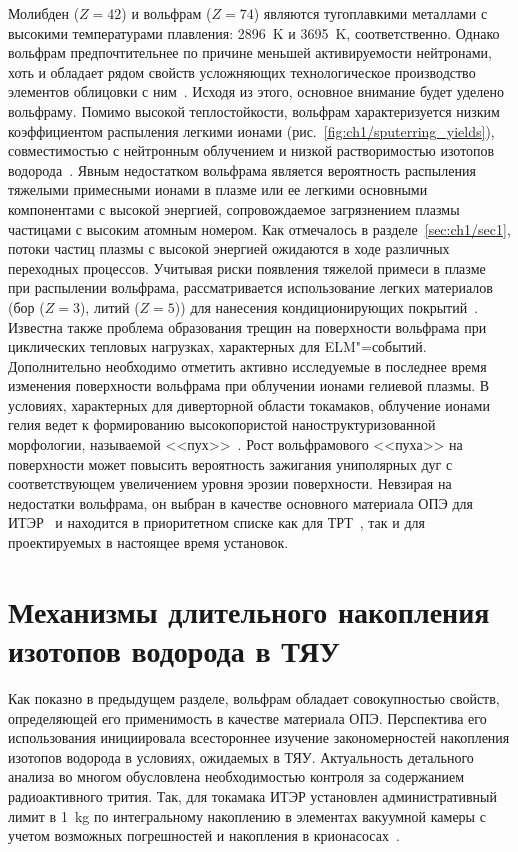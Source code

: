 Молибден ($Z=42$) и вольфрам ($Z=74$) являются тугоплавкими металлами с высокими температурами плавления: \SI{2896}{\kelvin} и \SI{3695}{\kelvin}, соответственно. Однако вольфрам предпочтительнее по причине меньшей активируемости нейтронами, хоть и обладает рядом свойств усложняющих технологическое производство элементов облицовки с ним~\cite{Piskarev2024}. Исходя из этого, основное внимание будет уделено вольфраму. Помимо высокой теплостойкости, вольфрам характеризуется низким коэффициентом распыления легкими ионами (рис.~\cref{fig:ch1/sputerring_yields}), совместимостью с нейтронным облучением и низкой растворимостью изотопов водорода~\cite{Roth2011, Pintsuk2012,Rieth2019}. Явным недостатком вольфрама является вероятность распыления тяжелыми примесными ионами в плазме или ее легкими основными компонентами с высокой энергией, сопровождаемое загрязнением плазмы частицами с высоким атомным номером. Как отмечалось в разделе~\cref{sec:ch1/sec1}, потоки частиц плазмы с высокой энергией ожидаются в ходе различных переходных процессов. Учитывая риски появления тяжелой примеси в плазме при распылении вольфрама, рассматривается использование легких материалов (бор ($Z=3$), литий ($Z=5$)) для нанесения кондиционирующих покрытий~\cite{Winter1996,Wauters2020}. Известна также проблема образования трещин на поверхности вольфрама при циклических тепловых нагрузках, характерных для ELM"=событий. Дополнительно необходимо отметить активно исследуемые в последнее время изменения поверхности вольфрама при облучении ионами гелиевой плазмы. В условиях, характерных для диверторной области токамаков, облучение ионами гелия ведет к формированию высокопористой наноструктуризованной морфологии, называемой <<пух>>~\cite{Ueda2018,Kajita2018,Fedorovich2019}. Рост вольфрамового <<пуха>> на поверхности может повысить вероятность зажигания униполярных дуг с соответствующем увеличением уровня эрозии поверхности. Невзирая на недостатки вольфрама, он выбран в качестве основного материала ОПЭ для ИТЭР~\cite{Pitts2025} и находится в приоритетном списке как для ТРТ~\cite{Piskarev2024}, так и для проектируемых в настоящее время установок. 

\section{Механизмы длительного накопления изотопов водорода в ТЯУ}\label{sec:ch1/sec3}
Как показно в предыдущем разделе, вольфрам обладает совокупностью свойств, определяющей его применимость в качестве материала ОПЭ. Перспектива его использования инициировала всестороннее изучение закономерностей накопления изотопов водорода в условиях, ожидаемых в ТЯУ. Актуальность детального анализа во многом обусловлена необходимостью контроля за содержанием радиоактивного трития. Так, для токамака ИТЭР установлен административный лимит в \SI{1}{\kilogram} по интегральному накоплению в элементах вакуумной камеры с учетом возможных погрешностей и накопления в крионасосах~\cite{Roth1}.

